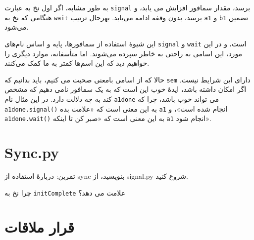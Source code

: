 \documentclass{book}
\begin{document}
به طور مشابه، اگر اول نخ  به عبارت \texttt{signal} برسد، مقدار سمافور افزایش می یابد، و هنگامی که نخ  
به \texttt{wait} برسد، بدون وقفه ادامه 
می‌یابد. بهرحال 
ترتیب \texttt{a1} و \texttt{b1} تضمین می‌شود.

این شیوهٔ استفاده از سمافورها، پایه و اساس نام‌های \texttt{signal} و \texttt{wait} است، 
و در این مورد، این اسامی به راحتی به خاطر سپرده می‌شوند. اما متأسفانه، موارد دیگری را خواهیم دید که این اسم‌ها کمتر به ما کمک می‌کنند.

حالا که از اسامی بامعنی صحبت می کنیم، باید بدانیم که \texttt{sem} دارای این شرایط نیست. 
اگر امکان داشته باشد، ایدهٔ خوب این است که به یک سمافور نامی دهیم که مشخص کند به چه دلالت دارد. 
در این مثال نام \texttt{a1done} می تواند خوب باشد، چرا که \texttt{ a1done.signal()} 
به این معنی است که «علامت بده \texttt{a1} انجام شده است»، و \texttt{a1done.wait()} 
به این معنی است که «صبر کن تا اینکه \texttt{a1} انجام شود».

\section{Sync.py}
\label{sync.py}

تمرین: دربارهٔ استفاده از sync بنویسید، از signal.py شروع کنید.

چرا نخ  به \texttt{initComplete} علامت می دهد؟


\section{قرار ملاقات}
\label{rendezvous}
\end{document}
